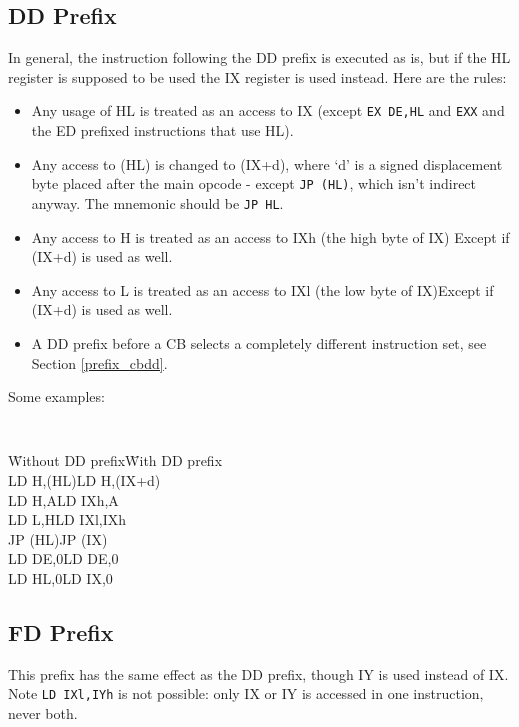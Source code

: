 \documentclass[12pt,twoside,openright,a4paper]{book}
\begin{document}
\subsection{DD Prefix \cite{gerton}}

In general, the instruction following the DD prefix is executed as is, but if the HL register is supposed to be used the IX register is used instead. Here are the rules:

\begin{itemize}
	\item Any usage of HL is treated as an access to IX (except {\tt EX DE,HL} and {\tt EXX} and the ED prefixed instructions that use HL).
	
	\item Any access to (HL) is changed to (IX+d), where `d' is a signed displacement byte placed after the main opcode - except {\tt JP (HL)}, which isn't indirect anyway. The mnemonic should be {\tt JP HL}.
	
	\item Any access to H is treated as an access to IXh (the high byte of IX)
	Except if (IX+d) is used as well.
	
	\item Any access to L is treated as an access to IXl (the low byte of IX)Except if (IX+d) is used as well.
	
	\item A DD prefix before a CB selects a completely different instruction set, see Section {\ref{prefix_cbdd}}.
\end{itemize}

Some examples:

{\tt 
	\begin{tabbing}
		{\qquad}\={\rm Without DD prefix}\qquad\={\rm With DD prefix}\+ \\
		LD H,(HL)\>LD H,(IX+d)\\
		LD H,A\>LD IXh,A\\
		LD L,H\>LD IXl,IXh\\
		JP (HL)\>JP (IX)\\
		LD DE,0\>LD DE,0\\
		LD HL,0\>LD IX,0\\
	\end{tabbing}
}


\subsection{FD Prefix \cite{gerton}}

This prefix has the same effect as the DD prefix, though IY is used instead of IX.  Note {\tt LD IXl,IYh} is not possible: only IX or IY is accessed in one instruction, never both.
\end{document}
